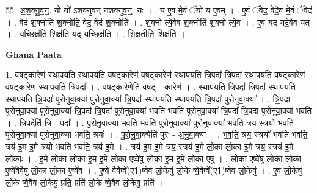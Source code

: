 \documentclass[17pt]{extarticle}
\begin{document}
55. अ॒श॒क्नु॒व॒न्॒. यो यो॑ ऽशक्नुवन् नशक्नुव॒न्॒. यः । . य ए॒व मे॒वं ॅयो य ए॒वम् । . ए॒वं ॅवेद॒ वेदै॒व मे॒वं ॅवेद॑ । . वेद॑ श॒क्नोति॑ श॒क्नोति॒ वेद॒ वेद॑ श॒क्नोति॑ । . श॒क्नो त्ये॒वैव श॒क्नोति॑ श॒क्नो त्ये॒व । . ए॒व यद् यदे॒वैव यत् । . यच्छिक्ष॑ति॒ शिक्ष॑ति॒ यद् यच्छिक्ष॑ति । . शिक्ष॒तीति॒ शिक्ष॑ति । \newline

\textbf{Ghana Paata } \newline

1. व॒ष॒ट्का॒रेण॑ स्थापयति स्थापयति वषट्का॒रेण॑ वषट्का॒रेण॑ स्थापयति त्रि॒पदा᳚ त्रि॒पदा᳚ स्थापयति वषट्का॒रेण॑ वषट्का॒रेण॑ स्थापयति त्रि॒पदा᳚ । . व॒ष॒ट्का॒रेणेति॑ वषट् - का॒रेण॑ । . स्था॒प॒य॒ति॒ त्रि॒पदा᳚ त्रि॒पदा᳚ स्थापयति स्थापयति त्रि॒पदा॑ पुरोनुवा॒क्या॑ पुरोनुवा॒क्या᳚ त्रि॒पदा᳚ स्थापयति स्थापयति त्रि॒पदा॑ पुरोनुवा॒क्या᳚ । . त्रि॒पदा॑ पुरोनुवा॒क्या॑ पुरोनुवा॒क्या᳚ त्रि॒पदा᳚ त्रि॒पदा॑ पुरोनुवा॒क्या॑ भवति भवति पुरोनुवा॒क्या᳚ त्रि॒पदा᳚ त्रि॒पदा॑ पुरोनुवा॒क्या॑ भवति । . त्रि॒पदेति॑ त्रि - पदा᳚ । . पु॒रो॒नु॒वा॒क्या॑ भवति भवति पुरोनुवा॒क्या॑ पुरोनुवा॒क्या॑ भवति॒ त्रय॒ स्त्रयो॑ भवति पुरोनुवा॒क्या॑ पुरोनुवा॒क्या॑ भवति॒ त्रयः॑ । . पु॒रो॒नु॒वा॒क्येति॑ पुरः - अ॒नु॒वा॒क्या᳚ । . भ॒व॒ति॒ त्रय॒ स्त्रयो॑ भवति भवति॒ त्रय॑ इ॒म इ॒मे त्रयो॑ भवति भवति॒ त्रय॑ इ॒मे । . त्रय॑ इ॒म इ॒मे त्रय॒ स्त्रय॑ इ॒मे लो॒का लो॒का इ॒मे त्रय॒ स्त्रय॑ इ॒मे लो॒काः । . इ॒मे लो॒का लो॒का इ॒म इ॒मे लो॒का ए॒ष्वे॑षु लो॒का इ॒म इ॒मे लो॒का ए॒षु । . लो॒का ए॒ष्वे॑षु लो॒का लो॒का ए॒ष्वे॑वैवैषु लो॒का लो॒का ए॒ष्वे॑व । . ए॒ष्वे॑ वैवैष्वे᳚(ए1॒)ष्वे॑व लो॒केषु॑ लो॒के ष्वे॒वैष्वे᳚(ए1॒)ष्वे॑व लो॒केषु॑ । . ए॒व लो॒केषु॑ लो॒के ष्वे॒वैव लो॒केषु॒ प्रति॒ प्रति॑ लो॒के ष्वे॒वैव लो॒केषु॒ प्रति॑ । \newline
\end{document}
